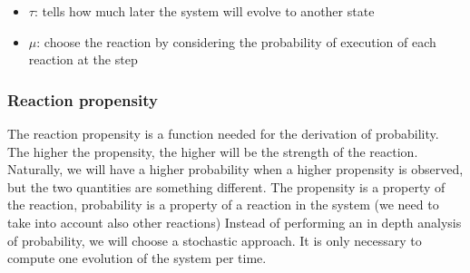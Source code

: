   \begin{itemize}
    \item \(\tau\): tells how much later the system will evolve to another state
    \item \(\mu\): choose the reaction by considering the probability of execution of each reaction at the step
  \end{itemize}

\subsubsection{Reaction propensity}
  The reaction propensity is a function needed for the derivation of probability.
  The higher the propensity, the higher will be the strength of the reaction.
  Naturally, we will have a higher probability when a higher propensity is observed, but the two quantities are something different.
  The propensity is a property of the reaction, probability is a property of a reaction in the system (we need to take into account also other reactions) Instead of performing an in depth analysis of probability, we will choose a stochastic approach.
  It is only necessary to compute one evolution of the system per time.

